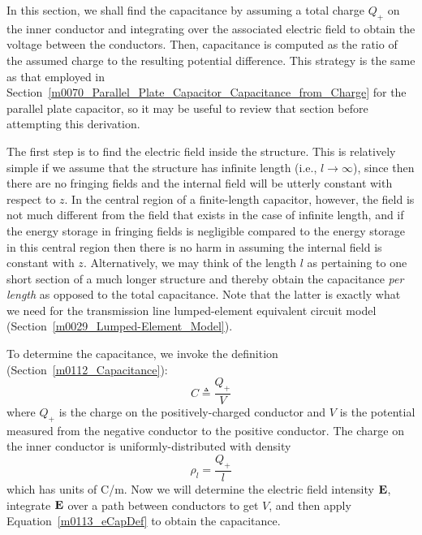 In this section, we shall find the capacitance by assuming a total charge $Q_+$ on the inner conductor and integrating over the associated electric field to obtain the voltage between the conductors.  Then, capacitance is computed as the ratio of the assumed charge to the resulting potential difference.
This strategy is the same as that employed in Section~\ref{m0070_Parallel_Plate_Capacitor_Capacitance_from_Charge} for the parallel plate capacitor, so it may be useful to review that section before attempting this derivation.

The first step is to find the electric field inside the structure.
This is relatively simple if we assume that the structure has infinite length (i.e., $l\to\infty$), since then there are no fringing fields and the internal field will be utterly constant with respect to $z$.
In the central region of a finite-length capacitor, however, the field is not much different from the field that exists in the case of infinite length, and if the energy storage in fringing fields is negligible compared to the energy storage in this central region then there is no harm in assuming the internal field is constant with $z$. 
Alternatively, we may think of the length $l$ as pertaining to one short section of a much longer structure and thereby obtain the capacitance \emph{per length} as opposed to the total capacitance.
Note that the latter is exactly what we need for the transmission line lumped-element equivalent circuit model (Section~\ref{m0029_Lumped-Element_Model}). 

To determine the capacitance, we invoke the definition (Section~\ref{m0112_Capacitance}):
%
\begin{equation}
C \triangleq \frac{Q_+}{V}
\label{m0113_eCapDef}
\end{equation}
%
where $Q_+$ is the charge on the positively-charged conductor and $V$ is the potential measured from the negative conductor to the positive conductor.
The charge on the inner conductor is uniformly-distributed with density 
%
\begin{equation}
\rho_l = \frac{Q_+}{l}
\end{equation}
%
which has units of C/m.
Now we will determine the electric field intensity ${\bf E}$, integrate ${\bf E}$ over a path between conductors to get $V$, and then apply Equation~\ref{m0113_eCapDef} to obtain the capacitance.

